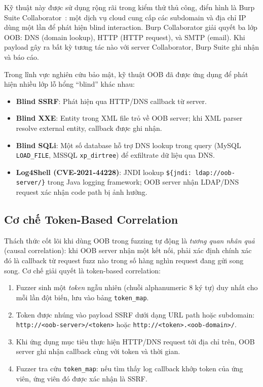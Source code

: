 Kỹ thuật này được sử dụng rộng rãi trong kiểm thử thủ công, điển hình là
Burp Suite Collaborator~\cite{portswigger2023burp}: một dịch vụ cloud cung
cấp các subdomain và địa chỉ IP dùng một lần để phát hiện blind interaction.
Burp Collaborator giải quyết ba lớp OOB: DNS (domain lookup), HTTP (HTTP
request), và SMTP (email). Khi payload gây ra bất kỳ tương tác nào với server
Collaborator, Burp Suite ghi nhận và báo cáo.

Trong lĩnh vực nghiên cứu bảo mật, kỹ thuật OOB đã được ứng dụng để phát
hiện nhiều lớp lỗ hổng ``blind'' khác nhau:
\begin{itemize}
    \item \textbf{Blind SSRF}: Phát hiện qua HTTP/DNS callback từ server.
    \item \textbf{Blind XXE}: Entity trong XML file trỏ về OOB server; khi
    XML parser resolve external entity, callback được ghi nhận.
    \item \textbf{Blind SQLi}: Một số database hỗ trợ DNS lookup trong query
    (MySQL \texttt{LOAD\_FILE}, MSSQL \texttt{xp\_dirtree}) để exfiltrate
    dữ liệu qua DNS.
    \item \textbf{Log4Shell (CVE-2021-44228)}: JNDI lookup \texttt{\$\{jndi:
    ldap://oob-server/\}} trong Java logging framework; OOB server nhận
    LDAP/DNS request xác nhận code path bị ảnh hưởng.
\end{itemize}

\subsection{Cơ chế Token-Based Correlation}
\label{subsec:oob-token}

Thách thức cốt lõi khi dùng OOB trong fuzzing tự động là \emph{tương quan
nhân quả} (causal correlation): khi OOB server nhận một kết nối, phải xác
định chính xác đó là callback từ request fuzz nào trong số hàng nghìn request
đang gửi song song. Cơ chế giải quyết là token-based correlation:

\begin{enumerate}
    \item Fuzzer sinh một \emph{token} ngẫu nhiên (chuỗi alphanumeric 8 ký
    tự) duy nhất cho mỗi lần đột biến, lưu vào bảng \texttt{token\_map}.
    \item Token được nhúng vào payload SSRF dưới dạng URL path hoặc subdomain:
    \texttt{http://<oob-server>/<token>} hoặc
    \texttt{http://<token>.<oob-domain>/}.
    \item Khi ứng dụng mục tiêu thực hiện HTTP/DNS request tới địa chỉ trên,
    OOB server ghi nhận callback cùng với token và thời gian.
    \item Fuzzer tra cứu \texttt{token\_map}: nếu tìm thấy log callback khớp
    token của ứng viên, ứng viên đó được xác nhận là SSRF.
\end{enumerate}

